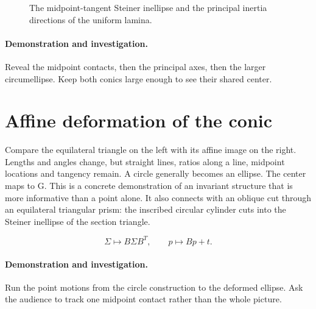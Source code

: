 \documentclass[11pt,oneside,openany]{book}
\begin{document}
\begin{figure}[htbp]
\caption[The midpoint-tangent Steiner inellipse and the principal inertia directions of the uniform lamina]{The midpoint-tangent Steiner inellipse and the principal inertia directions of the uniform lamina.}\label{fig:geometry-12}
\end{figure}

\paragraph{Demonstration and investigation.} Reveal the midpoint contacts, then the principal axes, then the larger circumellipse. Keep both conics large enough to see their shared center.


\section{Affine deformation of the conic}\label{sec:slide13}

Compare the equilateral triangle on the left with its affine image on the right. Lengths and angles change, but straight lines, ratios along a line, midpoint locations and tangency remain. A circle generally becomes an ellipse. The center maps to G. This is a concrete demonstration of an invariant structure that is more informative than a point alone. It also connects with an oblique cut through an equilateral triangular prism: the inscribed circular cylinder cuts into the Steiner inellipse of the section triangle.


\[\Sigma\mapsto B\Sigma B^T,\qquad p\mapsto Bp+t.\]



\paragraph{Demonstration and investigation.} Run the point motions from the circle construction to the deformed ellipse. Ask the audience to track one midpoint contact rather than the whole picture.
\end{document}
